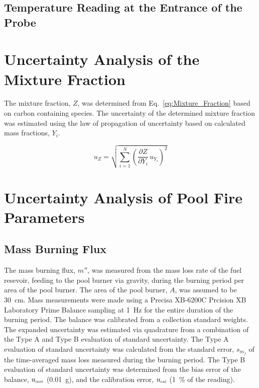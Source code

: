 \documentclass[12pt]{article}
\begin{document}
\subsection{Temperature Reading at the Entrance of the Probe}
\label{ssec:Probe_Temp}

\pagebreak

\section{Uncertainty Analysis of the Mixture Fraction}\label{sec:Uncertainty_Mix_Frac}
The mixture fraction, $Z$, was determined from Eq.~\ref{eq:Mixture_Fraction} based on carbon containing species. The uncertainty of the determined mixture fraction was estimated using the law of propagation of uncertainty based on calculated mass fractions, $Y_{i}$. 

\begin{equation}
\label{eq:mixture_frac_uncertainty}
u_{\scriptscriptstyle Z}=\sqrt{{\sum_{i=1}^{N}{\left(\frac{\partial Z}{\partial Y_{i}}\,u_{\scriptscriptstyle Y_{i}} \right)}^2}}
\end{equation}

\pagebreak

\section{Uncertainty Analysis of Pool Fire Parameters}\label{sec:Uncertainty_Pool_Fire_Parameters}

\subsection{Mass Burning Flux}
\label{ssec:Mass_Burning_Flux}
The mass burning flux, $m''$, was measured from the mass loss rate of the fuel resevoir, feeding to the pool burner via gravity, during the burning period per area of the pool burner. The area of the pool burner, $A$, was assumed to be 30~\si{cm}. Mass measurements were made using a Precisa XB-6200C Prcision XB Laboratory Prime Balance sampling at 1~\si{Hz} for the entire duration of the burning period. The balance was calibrated from a collection standard weights. The expanded uncertainty was estimated via quadrature from a combination of the Type A and Type B evaluation of standard uncertainty. The Type A evaluation of standard uncertainty was calculated from the standard error, $s_{\scriptscriptstyle m_{f}}$ of the time-averaged mass loss measured during the burning period. The Type B evaluation of standard uncertainty was determined from the bias error of the balance, $u_{\rm \scriptscriptstyle inst}$ (0.01~\si{g}), and the calibration error, $u_{\rm \scriptscriptstyle cal}$ (1~\% of the reading).
\end{document}
